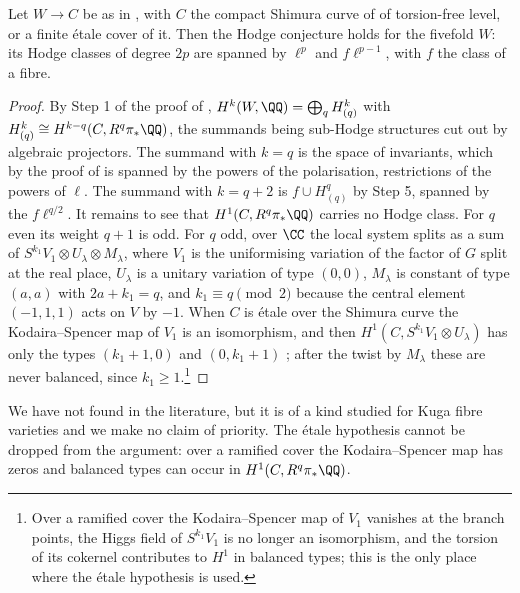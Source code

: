 \begin{proposition}
\label{prop:mumfordfivefold}
Let $W\to C$ be as in , with $C$ the compact
Shimura curve of \cite{Mum69} of torsion-free level, or a finite \'etale cover
of it. Then the Hodge conjecture holds for the fivefold $W$: its Hodge classes
of degree $2p$ are spanned by $\ell^{p}$ and $f\ell^{p-1}$, with $f$ the class
of a fibre.
\end{proposition}

\begin{proof}
By Step 1 of the proof of ,
$H^{k}(W,\QQ)=\bigoplus_{q}H^{k}_{(q)}$ with $H^{k}_{(q)}\cong
H^{k-q}(C,R^{q}\pi_{*}\QQ)$, the summands being sub-Hodge structures cut out by
algebraic projectors. The summand with $k=q$ is the space of invariants, which
by the proof of  is spanned by the powers of the
polarisation, restrictions of the powers of $\ell$. The summand with $k=q+2$
is $f\cup H^{q}_{(q)}$ by Step 5, spanned by the $f\ell^{q/2}$. It remains to
see that $H^{1}(C,R^{q}\pi_{*}\QQ)$ carries no Hodge class. For $q$ even its
weight $q+1$ is odd. For $q$ odd, over $\CC$ the local system splits as a sum
of $S^{k_{1}}V_{1}\otimes U_{\lambda}\otimes M_{\lambda}$, where $V_{1}$ is the
uniformising variation of the factor of $G$ split at the real place, $U_{\lambda}$ is
a unitary variation of type $(0,0)$, $M_{\lambda}$ is constant of type $(a,a)$
with $2a+k_{1}=q$, and $k_{1}\equiv q\pmod2$ because the central element
$(-1,1,1)$ acts on $V$ by $-1$. When $C$ is \'etale over the Shimura curve the
Kodaira--Spencer map of $V_{1}$ is an isomorphism, and then
$H^{1}(C,S^{k_{1}}V_{1}\otimes U_{\lambda})$ has only the types $(k_{1}+1,0)$
and $(0,k_{1}+1)$ \cite{Zuc79}; after the twist by $M_{\lambda}$ these are
never balanced, since $k_{1}\ge1$.\footnote{Over a ramified cover the
Kodaira--Spencer map of $V_{1}$ vanishes at the branch points, the Higgs
field of $S^{k_{1}}V_{1}$ is no longer an isomorphism, and the torsion of its
cokernel contributes to $H^{1}$ in balanced types; this is the only place
where the \'etale hypothesis is used.}
\end{proof}

We have not found  in the literature, but it is of a
kind studied for Kuga fibre varieties and we make no claim of priority. The
\'etale hypothesis cannot be dropped from the argument: over a ramified cover
the Kodaira--Spencer map has zeros and balanced types can occur in
$H^{1}(C,R^{q}\pi_{*}\QQ)$.


